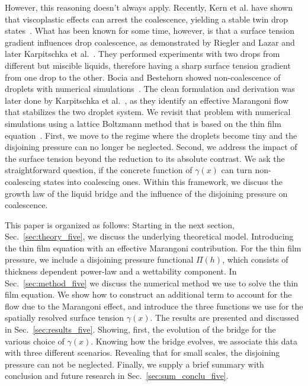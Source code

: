 However, this reasoning doesn't always apply. 
Recently, Kern et al. have shown that viscoplastic effects can arrest the coalescence, yielding a stable twin drop states~\cite{PhysRevFluids.7.L081601}.
What has been known for some time, however, is that a surface tension gradient influences drop coalescence, as demonstrated by Riegler and Lazar and later Karpitschka et al.~\cite{PhysRevLett.109.066103, doi:10.1021/la500459v, karpitschka2014sharp, bruning2018delayed}.
They performed experiments with two drops from different but miscible liquids, therefore having a sharp surface tension gradient from one drop to the other.
Bocia and Bestehorn showed non-coalescence of droplets with numerical simulations~\cite{PhysRevE.82.036312, borcia2011coalescence}.
The clean formulation and derivation was later done by Karpitschka et al.~\cite{PhysRevLett.109.066103}, as they identify an effective Marangoni flow that stabilizes the two droplet system.
We revisit that problem with numerical simulations using a lattice Boltzmann method that is based on the thin film equation~\cite{PhysRevE.100.033313}.
First, we move to the regime where the droplets become tiny and the disjoining pressure can no longer be neglected.
Second, we address the impact of the surface tension beyond the reduction to its absolute contrast.
We ask the straightforward question, if the concrete function of $\gamma(x)$ can turn non-coalescing states into coalescing ones.
Within this framework, we discuss the growth law of the liquid bridge and the influence of the disjoining pressure on coalescence.

This paper is organized as follows:
Starting in the next section, Sec.~\ref{sec:theory_five}, we discuss the underlying theoretical model.
Introducing the thin film equation with an effective Marangoni contribution. 
For the thin film pressure, we include a disjoining pressure functional $\Pi(h)$, which consists of thickness dependent power-law and a wettability component. 
In Sec.~\ref{sec:method_five} we discuss the numerical method we use to solve the thin film equation.
We show how to construct an additional term to account for the flow due to the Marangoni effect, and
introduce the three functions we use for the spatially resolved surface tension $\gamma(x)$. 
The results are presented and discussed in Sec.~\ref{sec:results_five}.
Showing, first, the evolution of the bridge for the various choice of $\gamma(x)$.
Knowing how the bridge evolves, we associate this data with three different scenarios.
Revealing that for small scales, the disjoining pressure can not be neglected.
Finally, we supply a brief summary with conclusion and future research in Sec.~\ref{sec:sum_conclu_five}. 

